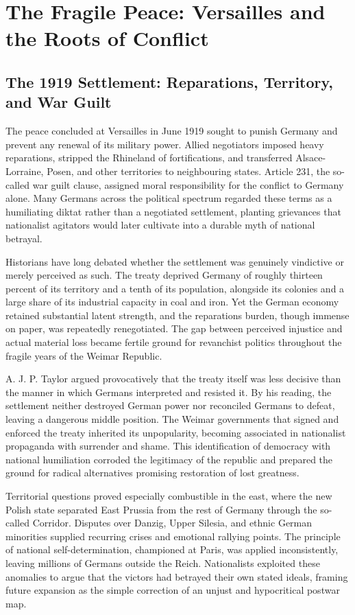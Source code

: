 \section{The Fragile Peace: Versailles and the Roots of Conflict}

\subsection{The 1919 Settlement: Reparations, Territory, and War Guilt}
The peace concluded at Versailles in June 1919 sought to punish Germany and prevent any renewal of its military power. Allied negotiators imposed heavy reparations, stripped the Rhineland of fortifications, and transferred Alsace-Lorraine, Posen, and other territories to neighbouring states. Article 231, the so-called war guilt clause, assigned moral responsibility for the conflict to Germany alone. Many Germans across the political spectrum regarded these terms as a humiliating diktat rather than a negotiated settlement, planting grievances that nationalist agitators would later cultivate into a durable myth of national betrayal.

Historians have long debated whether the settlement was genuinely vindictive or merely perceived as such. The treaty deprived Germany of roughly thirteen percent of its territory and a tenth of its population, alongside its colonies and a large share of its industrial capacity in coal and iron. Yet the German economy retained substantial latent strength, and the reparations burden, though immense on paper, was repeatedly renegotiated. The gap between perceived injustice and actual material loss became fertile ground for revanchist politics throughout the fragile years of the Weimar Republic.

A. J. P. Taylor argued provocatively that the treaty itself was less decisive than the manner in which Germans interpreted and resisted it. By his reading, the settlement neither destroyed German power nor reconciled Germans to defeat, leaving a dangerous middle position. The Weimar governments that signed and enforced the treaty inherited its unpopularity, becoming associated in nationalist propaganda with surrender and shame. This identification of democracy with national humiliation corroded the legitimacy of the republic and prepared the ground for radical alternatives promising restoration of lost greatness.

Territorial questions proved especially combustible in the east, where the new Polish state separated East Prussia from the rest of Germany through the so-called Corridor. Disputes over Danzig, Upper Silesia, and ethnic German minorities supplied recurring crises and emotional rallying points. The principle of national self-determination, championed at Paris, was applied inconsistently, leaving millions of Germans outside the Reich. Nationalists exploited these anomalies to argue that the victors had betrayed their own stated ideals, framing future expansion as the simple correction of an unjust and hypocritical postwar map.

